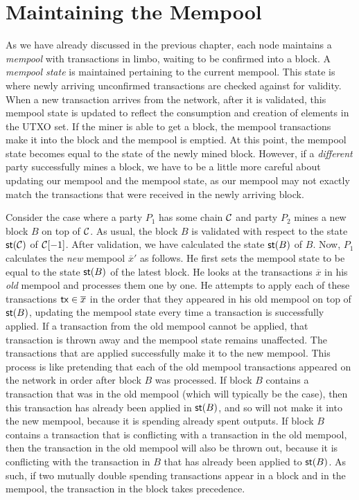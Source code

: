 \section{Maintaining the Mempool}

As we have already discussed in the previous chapter, each node maintains a \emph{mempool}
with transactions in limbo, waiting to be confirmed into a block. A \emph{mempool state}
is maintained pertaining to the current mempool. This state is where newly arriving unconfirmed
transactions are checked against for validity. When a new transaction arrives from the network,
after it is validated, this mempool state is updated to reflect the consumption and creation
of elements in the UTXO set. If the miner is able to
get a block, the mempool transactions make it into the block and the mempool is emptied.
At this point, the mempool state becomes equal to the state of the newly mined block.
However, if a \emph{different} party successfully mines a block, we have to be a little
more careful about updating our mempool and the mempool state, as our mempool may not exactly
match the transactions that were received in the newly arriving block.

Consider the case where a party $P_1$ has some chain $\mathcal{C}$ and party $P_2$ mines a new
block $B$ on top of $\mathcal{C}$. As usual, the block $B$ is validated with respect to the state
$\mathsf{st}(\mathcal{C})$ of $\mathcal{C}[-1]$. After validation, we have calculated the state $\mathsf{st}(B)$ of $B$.
Now, $P_1$ calculates the \emph{new} mempool $\overline{x}'$ as follows.
He first sets the mempool state to be equal to the state $\mathsf{st}(B)$ of the latest block.
He looks at the transactions $\overline{x}$ in his \emph{old} mempool and processes them
one by one. He attempts to apply each of these transactions $\mathsf{tx} \in \overline{x}$ in the
order that they appeared in his old mempool on top of $\mathsf{st}(B)$, updating the mempool state every time
a transaction is successfully applied. If a transaction from the old mempool
cannot be applied, that transaction is thrown away and the mempool state remains unaffected.
The transactions that are applied successfully
make it to the new mempool. This process is like pretending that each of the old mempool transactions
appeared on the network in order after block $B$ was processed. If block $B$ contains a transaction
that was in the old mempool (which will typically be the case), then this transaction has already
been applied in $\mathsf{st}(B)$, and so will not make it into the new mempool, because it is spending already
spent outputs. If block $B$ contains a transaction that is conflicting with a transaction
in the old mempool, then the transaction in the old mempool will also be thrown out, because it
is conflicting with the transaction in $B$ that has already been applied to $\mathsf{st}(B)$.
As such, if two mutually double spending transactions appear in a block and in the mempool,
the transaction in the block takes precedence.

